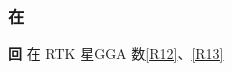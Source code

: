 \documentclass[11pt,a4paper]{article}
\numberwithin{equation}{section}
\numberwithin{figure}{section}
\begin{document}
\subsubsection{{\cjkfont 在}\allowbreak{}}

\textbf{{\cjkfont 回}\allowbreak{}} {\cjkfont 在}\allowbreak{} RTK {\cjkfont 星}\allowbreak{}GGA {\cjkfont 数}\allowbreak{}\hyperlink{ref-R12}{[R12]}{\cjkfont 、}\allowbreak{}\hyperlink{ref-R13}{[R13]}
\end{document}
